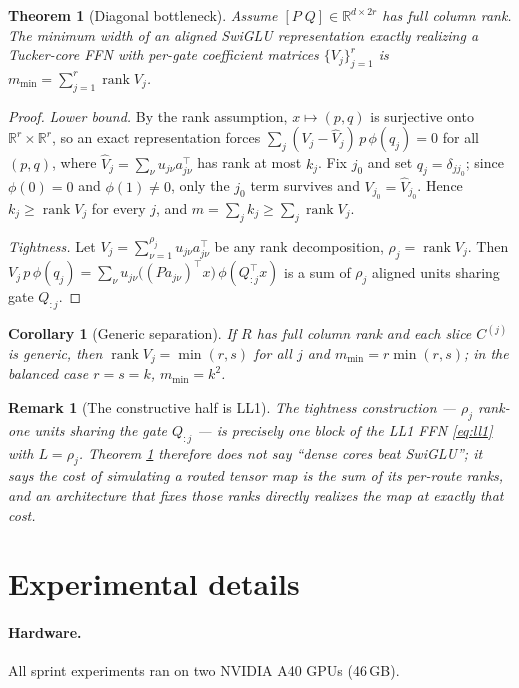 \documentclass[11pt]{article}
\newtheorem{theorem}{Theorem}
\newtheorem{corollary}{Corollary}
\newtheorem{remark}{Remark}
\newcommand{\R}{\mathbb{R}}
\newcommand{\T}{^{\top}}
\DeclareMathOperator{\rank}{rank}
\begin{document}
\begin{theorem}[Diagonal bottleneck]
\label{thm:bottleneck}
Assume $[P\;Q] \in \R^{d\times 2r}$ has full column rank. The minimum width of an
aligned SwiGLU representation exactly realizing a Tucker-core FFN with per-gate
coefficient matrices $\{V_j\}_{j=1}^r$ is $m_{\min} = \sum_{j=1}^{r} \rank V_j$.
\end{theorem}

\begin{proof}
\emph{Lower bound.} By the rank assumption, $x \mapsto (p, q)$ is surjective onto
$\R^r \times \R^r$, so an exact representation forces
$\sum_j (V_j - \hat V_j)\, p\, \phi(q_j) = 0$ for all $(p,q)$, where
$\hat V_j = \sum_\nu u_{j\nu} a_{j\nu}\T$ has rank at most $k_j$. Fix $j_0$ and set
$q_j = \delta_{jj_0}$; since $\phi(0) = 0$ and $\phi(1) \ne 0$, only the $j_0$ term
survives and $V_{j_0} = \hat V_{j_0}$. Hence $k_j \ge \rank V_j$ for every $j$, and
$m = \sum_j k_j \ge \sum_j \rank V_j$.

\emph{Tightness.} Let $V_j = \sum_{\nu=1}^{\rho_j} u_{j\nu} a_{j\nu}\T$ be any rank
decomposition, $\rho_j = \rank V_j$. Then
$V_j\, p\, \phi(q_j) = \sum_\nu u_{j\nu} \big((P a_{j\nu})\T x\big)\,
\phi(Q_{:j}\T x)$ is a sum of $\rho_j$ aligned units sharing gate $Q_{:j}$.
\end{proof}

\begin{corollary}[Generic separation]
If $R$ has full column rank and each slice $C^{(j)}$ is generic, then
$\rank V_j = \min(r,s)$ for all $j$ and $m_{\min} = r \min(r,s)$; in the balanced
case $r=s=k$, $m_{\min} = k^2$.
\end{corollary}

\begin{remark}[The constructive half is LL1]
The tightness construction --- $\rho_j$ rank-one units sharing the gate $Q_{:j}$ ---
is precisely one block of the LL1 FFN \eqref{eq:ll1} with $L = \rho_j$. Theorem
\ref{thm:bottleneck} therefore does not say ``dense cores beat SwiGLU''; it says the
cost of simulating a routed tensor map is the sum of its per-route ranks, and an
architecture that fixes those ranks directly realizes the map at exactly that cost.
\end{remark}

\section{Experimental details}
\label{app:details}

\paragraph{Hardware.} All sprint experiments ran on two NVIDIA A40 GPUs (46\,GB).
\end{document}
